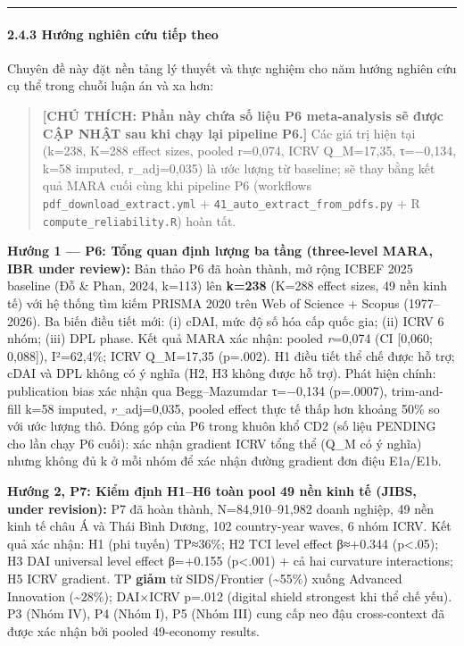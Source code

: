 \documentclass[12pt,a4paper]{article}
\begin{document}
\begin{center}\rule{0.5\linewidth}{0.5pt}\end{center}

\hypertarget{243-hux1b0ux1edbng-nghiuxean-cux1ee9u-tiux1ebfp-theo}{%
\paragraph{2.4.3 Hướng nghiên cứu tiếp
theo}\label{243-hux1b0ux1edbng-nghiuxean-cux1ee9u-tiux1ebfp-theo}}

Chuyên đề này đặt nền tảng lý thuyết và thực nghiệm cho năm hướng nghiên
cứu cụ thể trong chuỗi luận án và xa hơn:

\begin{quote}
\textbf{{[}CHÚ THÍCH: Phần này chứa số liệu P6 meta-analysis sẽ được CẬP
NHẬT sau khi chạy lại pipeline P6.{]}} Các giá trị hiện tại (k=238,
K=288 effect sizes, pooled r=0,074, ICRV Q\_M=17,35, τ=−0,134, k=58
imputed, r\_adj=0,035) là ước lượng từ baseline; sẽ thay bằng kết quả
MARA cuối cùng khi pipeline P6 (workflows
\texttt{pdf\_download\_extract.yml} +
\texttt{41\_auto\_extract\_from\_pdfs.py} + R
\texttt{compute\_reliability.R}) hoàn tất.
\end{quote}

\textbf{Hướng 1 --- P6: Tổng quan định lượng ba tầng (three-level MARA,
IBR under review):} Bản thảo P6 đã hoàn thành, mở rộng ICBEF 2025
baseline (Đỗ \& Phan, 2024, k=113) lên \textbf{k=238} (K=288 effect
sizes, 49 nền kinh tế) với hệ thống tìm kiếm PRISMA 2020 trên Web of
Science + Scopus (1977--2026). Ba biến điều tiết mới: (i) cDAI, mức độ
số hóa cấp quốc gia; (ii) ICRV 6 nhóm; (iii) DPL phase. Kết quả MARA xác
nhận: pooled \emph{r}=0,074 (CI {[}0,060; 0,088{]}), I²=62,4\%; ICRV
Q\_M=17,35 (p=.002). H1 điều tiết thể chế được hỗ trợ; cDAI và DPL không
có ý nghĩa (H2, H3 không được hỗ trợ). Phát hiện chính: publication bias
xác nhận qua Begg--Mazumdar τ=−0,134 (p=.0007), trim-and-fill k=58
imputed, \emph{r}\_adj=0,035, pooled effect thực tế thấp hơn khoảng 50\%
so với ước lượng thô. Đóng góp của P6 trong khuôn khổ CD2 (số liệu
PENDING cho lần chạy P6 cuối): xác nhận gradient ICRV tổng thể (Q\_M có
ý nghĩa) nhưng không đủ k ở mỗi nhóm để xác nhận đường gradient đơn điệu
E1a/E1b.

\textbf{Hướng 2, P7: Kiểm định H1--H6 toàn pool 49 nền kinh tế (JIBS,
under revision):} P7 đã hoàn thành, N=84,910--91,982 doanh nghiệp, 49
nền kinh tế châu Á và Thái Bình Dương, 102 country-year waves, 6 nhóm
ICRV. Kết quả xác nhận: H1 (phi tuyến) TP≈36\%; H2 TCI level effect
β≈+0.344 (p\textless.05); H3 DAI universal level effect β=+0.155
(p\textless.001) + cả hai curvature interactions; H5 ICRV gradient. TP
\textbf{giảm} từ SIDS/Frontier (\textasciitilde55\%) xuống Advanced
Innovation (\textasciitilde28\%); DAI×ICRV p=.012 (digital shield
strongest khi thể chế yếu). P3 (Nhóm IV), P4 (Nhóm I), P5 (Nhóm III)
cung cấp neo đậu cross-context đã được xác nhận bởi pooled 49-economy
results.
\end{document}
